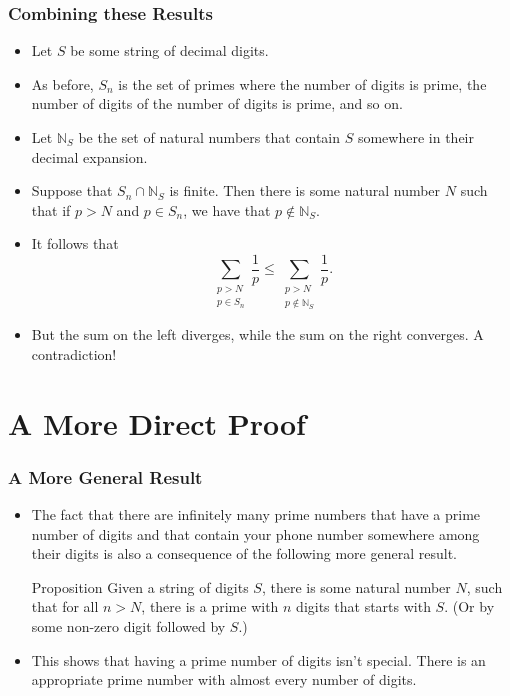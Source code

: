\documentclass{beamer}
\begin{document}
\begin{frame}
    \frametitle{Combining these Results}

    \begin{itemize}
        \item Let $S$ be some string of decimal digits. \pause
        \item As before, $S_n$ is the set of primes where the number of digits is prime, the number of digits of the number of digits is prime, and so on. \pause
        \item Let $\mathbb{N}_S$ be the set of natural numbers that contain $S$ somewhere in their decimal expansion. \pause
        \item Suppose that $S_n \cap \mathbb{N}_S$ is finite. Then there is some natural number $N$ such that if $p > N$ and $p \in S_n$, we have that $p \not\in \mathbb{N}_S$. \pause
        \item It follows that
        \[
            \sum_{\substack{p > N\\ p \in S_n}} \frac{1}{p} \leq \sum_{\substack{p > N\\ p \not\in \mathbb{N}_S}} \frac{1}{p}.
        \]
        \pause
        \item But the sum on the left diverges, while the sum on the right converges. A contradiction!
    \end{itemize}

\end{frame}

\section{A More Direct Proof}

\begin{frame}
    \frametitle{A More General Result}

    \begin{itemize}
        \item The fact that there are infinitely many prime numbers that have a prime number of digits and that contain your phone number somewhere among their digits is also a consequence of the following more general result.
        \begin{block}{Proposition}
            Given a string of digits $S$, there is some natural number $N$, such that for all $n > N$, there is a prime with $n$ digits that starts with $S$. (Or by some non-zero digit followed by $S$.)
        \end{block}
        \pause
        \item This shows that having a prime number of digits isn't special. There is an appropriate prime number with almost every number of digits.
    \end{itemize}

\end{frame}
\end{document}
